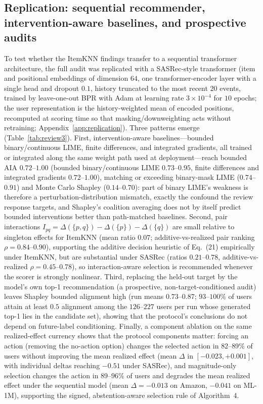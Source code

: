 \documentclass[pdflatex,sn-mathphys-num]{sn-jnl}
\theoremstyle{thmstyleone}
\theoremstyle{thmstyletwo}
\theoremstyle{thmstylethree}
\begin{document}
\subsection{Replication: sequential recommender, intervention-aware baselines, and prospective audits}\label{app:replication-sec}
To test whether the ItemKNN findings transfer to a sequential transformer architecture, the full audit was replicated with a SASRec-style transformer (item and positional embeddings of dimension $64$, one transformer-encoder layer with a single head and dropout $0.1$, history truncated to the most recent $20$ events, trained by leave-one-out BPR with Adam at learning rate $3\times10^{-4}$ for $10$ epochs; the user representation is the history-weighted mean of encoded positions, recomputed at scoring time so that masking/downweighting acts without retraining; Appendix~\ref{app:replication}). Three patterns emerge (Table~\ref{tab:review3}). First, intervention-aware baselines---bounded binary/continuous LIME, finite differences, and integrated gradients, all trained or integrated along the same weight path used at deployment---reach bounded AIA $0.72$--$1.00$ (bounded binary/continuous LIME $0.73$--$0.95$, finite differences and integrated gradients $0.72$--$1.00$), matching or exceeding binary-mask LIME ($0.74$--$0.91$) and Monte Carlo Shapley ($0.14$--$0.70$): part of binary LIME's weakness is therefore a perturbation-distribution mismatch, exactly the confound the review response targets, and Shapley's coalition averaging does not by itself predict bounded interventions better than path-matched baselines. Second, pair interactions $I_{pq}=\Delta(\{p,q\})-\Delta(\{p\})-\Delta(\{q\})$ are small relative to singleton effects for ItemKNN (mean ratio $0.07$; additive-vs-realized pair ranking $\rho=0.84$--$0.90$), supporting the additive decision heuristic of Eq.~(21) empirically under ItemKNN, but are substantial under SASRec (ratios $0.21$--$0.78$, additive-vs-realized $\rho=0.45$--$0.78$), so interaction-aware selection is recommended whenever the scorer is strongly nonlinear. Third, replacing the held-out target by the model's own top-1 recommendation (a prospective, non-target-conditioned audit) leaves Shapley bounded alignment high (run means $0.73$--$0.87$; $93$--$100\%$ of users attain at least $0.5$ alignment among the $126$--$227$ users per run whose generated top-1 lies in the candidate set), showing that the protocol's conclusions do not depend on future-label conditioning. Finally, a component ablation on the same realized-effect currency shows that the protocol components matter: forcing an action (removing the no-action option) changes the selected action in $82$--$89\%$ of users without improving the mean realized effect (mean $\Delta$ in $[-0.023,+0.001]$, with individual deltas reaching $-0.51$ under SASRec), and magnitude-only selection changes the action in $89$--$96\%$ of users and degrades the mean realized effect under the sequential model (mean $\Delta=-0.013$ on Amazon, $-0.041$ on ML-1M), supporting the signed, abstention-aware selection rule of Algorithm~4.
\end{document}
